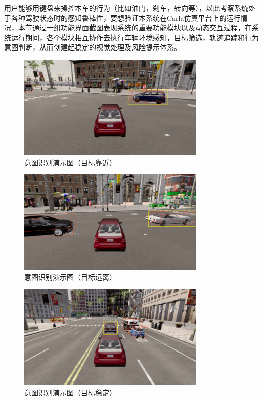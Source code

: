 用户能够用键盘来操控本车的行为（比如油门，刹车，转向等），以此考察系统处于各种驾驶状态时的感知鲁棒性，要想验证本系统在Carla仿真平台上的运行情况，本节通过一组功能界面截图表现系统的重要功能模块以及动态交互过程，在系统运行期间，各个模块相互协作去执行车辆环境感知，目标筛选，轨迹追踪和行为意图判断，从而创建起稳定的视觉处理及风险提示体系。

\begin{figure}[H]
	\centering
	\includegraphics[width=0.8\textwidth]{images/图13 意图识别演示图（目标靠近）.pdf}  %
	\caption{意图识别演示图（目标靠近）}
	\label{fig:example_image}  %
\end{figure}

\begin{figure}[H]
	\centering
	\includegraphics[width=0.8\textwidth]{images/图14 意图识别演示图（目标远离）.pdf}  %
	\caption{意图识别演示图（目标远离）}
	\label{fig:example_image}  %
\end{figure}

\begin{figure}[H]
	\centering
	\includegraphics[width=0.8\textwidth]{images/图15 意图识别演示图（目标稳定）.pdf}  %
	\caption{意图识别演示图（目标稳定）}
	\label{fig:example_image}  %
\end{figure}

